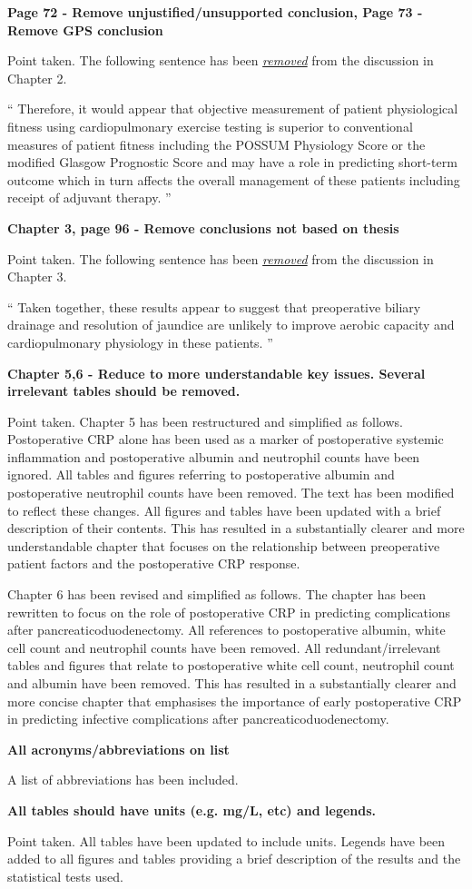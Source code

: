 \textbf{Page 72 - Remove unjustified/unsupported conclusion, Page 73 - Remove GPS conclusion}
	
	Point taken. The following sentence has been \underline{\textit{removed}} from the discussion in Chapter 2.
	
	\textquotedblleft
	Therefore, it would appear that objective measurement of patient physiological fitness using cardiopulmonary exercise testing is superior to conventional measures of patient fitness including the POSSUM Physiology Score or the modified Glasgow Prognostic Score and may have a role in predicting short-term outcome which in turn affects the overall management of these patients including receipt of adjuvant therapy.
	\textquotedblright
	
\textbf{Chapter 3, page 96 - Remove conclusions not based on thesis}
	
	Point taken. The following sentence has been \underline{\textit{removed}} from the discussion in Chapter 3.
	
	\textquotedblleft
	Taken together, these results appear to suggest that preoperative biliary drainage and resolution of jaundice are unlikely to improve aerobic capacity and cardiopulmonary physiology in these patients.
	\textquotedblright
	
\textbf{Chapter 5,6 - Reduce to more understandable key issues. Several irrelevant tables should be removed.}

	Point taken. 
	Chapter 5 has been restructured and simplified as follows. 
	Postoperative CRP alone has been used as a marker of postoperative systemic inflammation and postoperative albumin and neutrophil counts have been ignored.
	All tables and figures referring to postoperative albumin and postoperative neutrophil counts have been removed. 
	The text has been modified to reflect these changes. 
	All figures and tables have been updated with a brief description of their contents. 
	This has resulted in a substantially clearer and more understandable chapter that focuses on the relationship between preoperative patient factors and the postoperative CRP response.
	
	Chapter 6 has been revised and simplified as follows.
	The chapter has been rewritten to focus on the role of postoperative CRP in predicting complications after pancreaticoduodenectomy.
	All references to postoperative albumin, white cell count and neutrophil counts have been removed.
	All redundant/irrelevant tables and figures that relate to postoperative white cell count, neutrophil count and albumin have been removed.
	This has resulted in a substantially clearer and more concise chapter that emphasises the importance of early postoperative CRP in predicting infective complications after pancreaticoduodenectomy.
	
\textbf{All acronyms/abbreviations on list}
	
	A list of abbreviations has been included.
	
\textbf{All tables should have units (e.g. mg/L, etc) and legends.}
	
	Point taken. 
	All tables have been updated to include units. 
	Legends have been added to all figures and tables providing a brief description of the results and the statistical tests used.